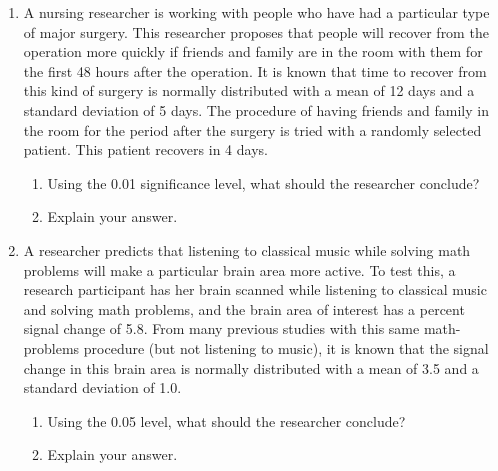 \documentclass[12pt]{article}%
\begin{document}
\mbox{}
\large
\begin{enumerate}

  
\item A nursing researcher is working with people who have had a particular type of major surgery.  This researcher proposes that people will recover from the operation more quickly if friends and family are in the room with them for the first 48 hours after the operation.  It is known that time to recover from this kind of surgery is normally distributed with a mean of 12 days and a standard deviation of 5 days.  The procedure of having friends and family in the room for the period after the surgery is tried with a randomly selected patient.  This patient recovers in 4 days.

\begin{enumerate}
	\item Using the 0.01 significance level, what should the researcher conclude?  \\[4in]
	\item Explain your answer.
\end{enumerate}

\newpage

\item A researcher predicts that listening to classical music while solving math problems will make a particular brain area more active. To test this, a research participant has her brain scanned while listening to classical music and solving math problems, and the brain area of interest has a percent signal change of 5.8.  From many previous studies with this same math-problems procedure (but not listening to music), it is known that the signal change in this brain area is normally distributed with a mean of 3.5 and a standard deviation of 1.0.  

\begin{enumerate}
	\item Using the 0.05 level, what should the researcher conclude?\\[4in]
	\item Explain your answer.

\end{enumerate}

\end{enumerate}
\end{document}
